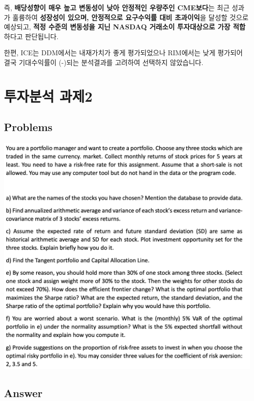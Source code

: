 \documentclass[
  letterpaper,
  DIV=11,
  numbers=noendperiod]{scrreprt}
\begin{document}
즉, \textbf{배당성향이 매우 높고 변동성이 낮아 안정적인 우량주인
CME보다}는 최근 성과가 훌륭하여 \textbf{성장성이 있으며, 안정적으로
요구수익률 대비 초과이익}을 달성할 것으로 예상되고, \textbf{적정 수준의
변동성을 지닌 NASDAQ 거래소이 투자대상으로 가장 적합}하다고 판단됩니다.

한편, ICE는 DDM에서는 내재가치가 좋게 평가되었으나 RIM에서는 낮게
평가되어 결국 기대수익률이 (-)되는 분석결과를 고려하여 선택하지
않았습니다.

\chapter*{투자분석 과제2}\label{uxd22cuxc790uxbd84uxc11d-uxacfcuxc81c2}


\section*{Problems}\label{problems}


\includegraphics{images/investment_hw2.png}

\section*{Answer}\label{answer-5}
\end{document}
